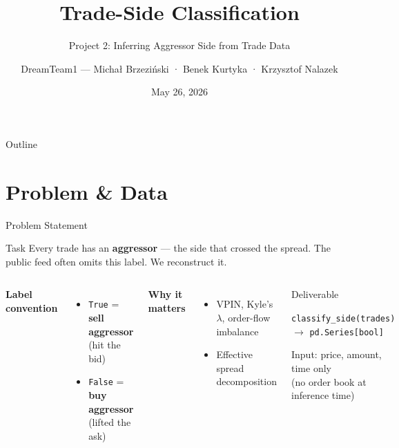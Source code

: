 \documentclass[aspectratio=169,10pt]{beamer}
\author[DreamTeam1]{DreamTeam1 — Michał Brzeziński · Benek Kurtyka · Krzysztof Nalazek}
\institute{Algorithmic Trading Systems — Final Project}
\title[Trade-Side Classification]{Trade-Side Classification}
\subtitle{Project 2: Inferring Aggressor Side from Trade Data}
\date{May 26, 2026}
\newcommand{\code}[1]{\texttt{\small #1}}
\begin{document}
\begin{frame}
  \titlepage
\end{frame}

\begin{frame}{Outline}
  \tableofcontents
\end{frame}

\section{Problem \& Data}

\begin{frame}{Problem Statement}
  \begin{block}{Task}
    Every trade has an \textbf{aggressor} — the side that crossed the spread.
    The public feed often omits this label. We reconstruct it.
  \end{block}

  \medskip
  \begin{columns}[T]
    \textbf{Label convention}
    \begin{itemize}
      \item \code{True}  = \textbf{sell aggressor} (hit the bid)
      \item \code{False} = \textbf{buy aggressor} (lifted the ask)
    \end{itemize}
    \medskip
    \textbf{Why it matters}
    \begin{itemize}
      \item VPIN, Kyle's $\lambda$, order-flow imbalance
      \item Effective spread decomposition
    \end{itemize}

    \begin{exampleblock}{Deliverable}
      \small
      \begin{center}
        \texttt{classify\_side(trades)}\\
        $\to$ \texttt{pd.Series[bool]}
      \end{center}
      \smallskip
      Input: price, amount, time only\\
      {\footnotesize (no order book at inference time)}
    \end{exampleblock}
  \end{columns}
\end{frame}
\end{document}
